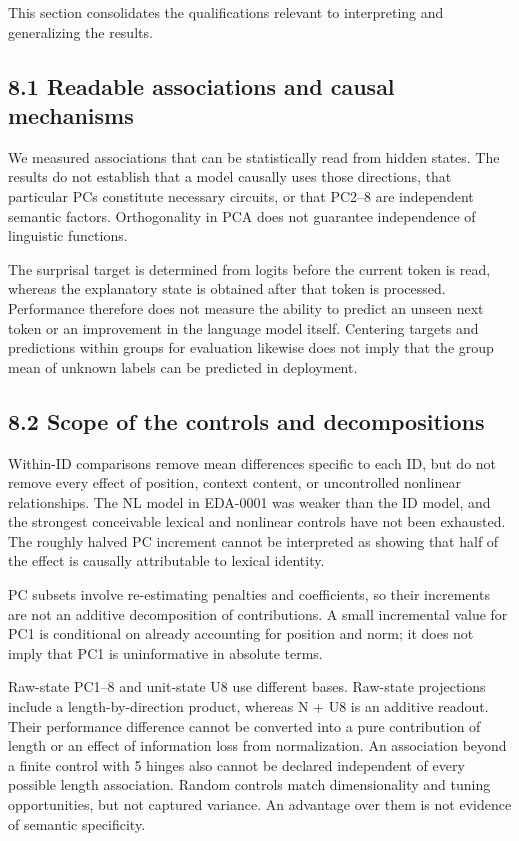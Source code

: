 This section consolidates the qualifications relevant to interpreting and generalizing the results.

\FloatBarrier

\subsection{8.1 Readable associations and causal mechanisms}\label{readable-associations-and-causal-mechanisms}

We measured associations that can be statistically read from hidden states. The results do not establish that a model causally uses those directions, that particular PCs constitute necessary circuits, or that PC2--8 are independent semantic factors. Orthogonality in PCA does not guarantee independence of linguistic functions.

The surprisal target is determined from logits before the current token is read, whereas the explanatory state is obtained after that token is processed. Performance therefore does not measure the ability to predict an unseen next token or an improvement in the language model itself. Centering targets and predictions within groups for evaluation likewise does not imply that the group mean of unknown labels can be predicted in deployment.

\FloatBarrier

\subsection{8.2 Scope of the controls and decompositions}\label{scope-of-the-controls-and-decompositions}

Within-ID comparisons remove mean differences specific to each ID, but do not remove every effect of position, context content, or uncontrolled nonlinear relationships. The NL model in EDA-0001 was weaker than the ID model, and the strongest conceivable lexical and nonlinear controls have not been exhausted. The roughly halved PC increment cannot be interpreted as showing that half of the effect is causally attributable to lexical identity.

PC subsets involve re-estimating penalties and coefficients, so their increments are not an additive decomposition of contributions. A small incremental value for PC1 is conditional on already accounting for position and norm; it does not imply that PC1 is uninformative in absolute terms.

Raw-state PC1--8 and unit-state U8 use different bases. Raw-state projections include a length-by-direction product, whereas N + U8 is an additive readout. Their performance difference cannot be converted into a pure contribution of length or an effect of information loss from normalization. An association beyond a finite control with 5 hinges also cannot be declared independent of every possible length association. Random controls match dimensionality and tuning opportunities, but not captured variance. An advantage over them is not evidence of semantic specificity.

